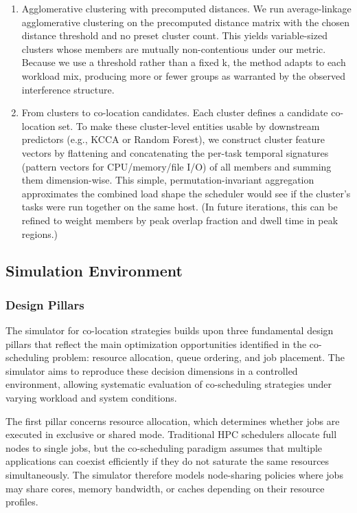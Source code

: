 \begin{enumerate}
    \item Agglomerative clustering with precomputed distances. We run average-linkage agglomerative clustering on the precomputed distance matrix with the chosen distance threshold and no preset cluster count. This yields variable-sized clusters whose members are mutually non-contentious under our metric. Because we use a threshold rather than a fixed k, the method adapts to each workload mix, producing more or fewer groups as warranted by the observed interference structure.
    \item From clusters to co-location candidates. Each cluster defines a candidate co-location set. To make these cluster-level entities usable by downstream predictors (e.g., KCCA or Random Forest), we construct cluster feature vectors by flattening and concatenating the per-task temporal signatures (pattern vectors for CPU/memory/file I/O) of all members and summing them dimension-wise. This simple, permutation-invariant aggregation approximates the combined load shape the scheduler would see if the cluster’s tasks were run together on the same host. (In future iterations, this can be refined to weight members by peak overlap fraction and dwell time in peak regions.)
\end{enumerate}

\subsection{Simulation Environment}
\label{sec:simulation_environment}

\subsubsection{Design Pillars}
\label{sec:design_pillars}
The simulator for co-location strategies builds upon three fundamental design pillars that reflect the main optimization opportunities identified in the co-scheduling problem: resource allocation, queue ordering, and job placement. The simulator aims to reproduce these decision dimensions in a controlled environment, allowing systematic evaluation of co-scheduling strategies under varying workload and system conditions.

The first pillar concerns resource allocation, which determines whether jobs are executed in exclusive or shared mode. Traditional HPC schedulers allocate full nodes to single jobs, but the co-scheduling paradigm assumes that multiple applications can coexist efficiently if they do not saturate the same resources simultaneously. The simulator therefore models node-sharing policies where jobs may share cores, memory bandwidth, or caches depending on their resource profiles.

